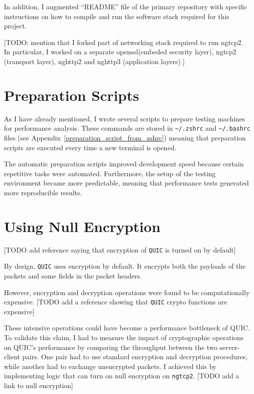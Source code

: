 \documentclass[12pt,a4paper,twoside,openright]{report}
\begin{document}
In addition, I augmented \enquote{README} file of the primary repository with specific instructions on how to compile and run the software stack required for this project.

[TODO: mention that I forked part of networking stack required to run ngtcp2. In particular, I worked on a separate openssl(embeded security layer), ngtcp2 (transport layer), nghttp2 and nghttp3 (application layers) ]

\section{Preparation Scripts}
As I have already mentioned, I wrote several scripts to prepare testing machines for performance analysis.
These commands are stored in \texttt{\textasciitilde/.zshrc} and \texttt{\textasciitilde/.bashrc} files (see Appendix~\ref{preparation_script_from_zshrc}) meaning that preparation scripts are executed every time a new terminal is opened.



The automatic preparation scripts improved development speed because certain repetitive tasks were automated.
Furthermore, the setup of the testing environment became more predictable, meaning that performance tests generated more reproducible results.



\section{Using Null Encryption}
[TODO add reference saying that encryption of \texttt{QUIC} is turned on by default]

By design, \texttt{QUIC} uses encryption by default.
It encrypts both the payloads of the packets and some fields in the packet headers.


However, encryption and decryption operations were found to be computationally expensive.
[TODO add a reference showing that \texttt{QUIC} crypto functions are expensive]

These intensive operations could have become a performance bottleneck of QUIC.
To validate this claim, I had to measure the impact of cryptographic operations on QUIC's performance by comparing the throughput between the two server-client pairs.
One pair had to use standard encryption and decryption procedures, while another had to exchange unencrypted packets.
I achieved this by implementing logic that can turn on null encryption on \texttt{ngtcp2}.
[TODO add a link to null encryption]
\end{document}

